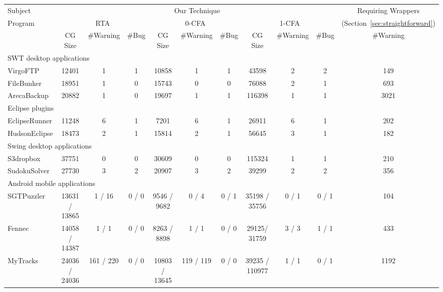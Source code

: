 \begin{table*}[ht]
\begin{center}
 \fontsize{9pt}{\baselineskip}\selectfont
\hspace*{-0.2cm}
\setlength{\tabcolsep}{.14\tabcolsep}
\begin{tabular}{|l||c|c|c||c|c|c||c|c|c||c|}
\hline
 Subject&  \multicolumn{9}{|c||}{Our Technique} & Requiring Wrappers  \\
\cline{2-10}
 Program  &  \multicolumn{3}{|c||}{RTA }& \multicolumn{3}{|c||}{0-CFA } & \multicolumn{3}{|c||}{1-CFA } & (Section~\ref{sec:straightforward})  \\
\cline{2-11}
 & CG Size & \#Warning & \#Bug & CG Size & \#Warning & \#Bug & CG Size & \#Warning & \#Bug & \#Warning \\
\hline \hline
\multicolumn{11}{|l|}{SWT desktop applications}   \\
 \hline
 VirgoFTP&  12401 &  1 &  1 & 10858 & 1 & 1 & 43598 & 2 & 2& 149  \\
 \hline
 FileBunker &  18951 &  1 &  0 & 15743 & 0 & 0 & 76088 & 2 & 1& 693  \\
 \hline
 ArecaBackup&  20882 &  1  &  0 & 19697 & 1 & 1  & 116398 & 1 & 1 & 3021\\
 \hline
 \hline
\multicolumn{11}{|l|}{Eclipse plugins}   \\
 \hline
 EclipseRunner&  11248&  6 &  1 & 7201 & 6 & 1 & 26911 & 6 & 1& 202  \\
 \hline
 HudsonEclipse& 18473 &  2 &  1 & 15814 & 2 & 1& 56645 & 3 & 1 & 182 \\
 \hline
 \hline
\multicolumn{11}{|l|}{Swing desktop applications}   \\
 \hline
 S3dropbox & 37751 &  0 &  0 & 30609 & 0 & 0 & 115324 & 1 & 1 & 210  \\
 \hline
  SudokuSolver&  27730&  3 &  2 & 20907 & 3 & 2 & 39299 & 2 & 2 & 356  \\
 \hline
 \hline
\multicolumn{11}{|l|}{Android mobile applications}   \\
 \hline
 SGTPuzzler & 13631 / 13865&  1 / 16 &  0 / 0 & 9546 / 9682& 0 / 4& 0 / 1 & 35198 / 35756 & 0 / 1  & 0 / 1& 104 \\
 \hline
 Fennec & 14058 / 14387 &  1 / 1 &  0 / 0 & 8263 / 8898 & 1 / 1 & 0 / 0& 29125/ 31759 & 3 / 3 & 1 / 1& 433 \\
 \hline
 MyTracks & 24036 / 24036 &  161 / 220 & 0 / 0 & 10803 / 13645 & 119 / 119 & 0 / 0 & 39235 / 110977 & 1 / 1 & 0 / 1 & 1192 \\

\end{tabular}
\end{center}
\end{table*}
